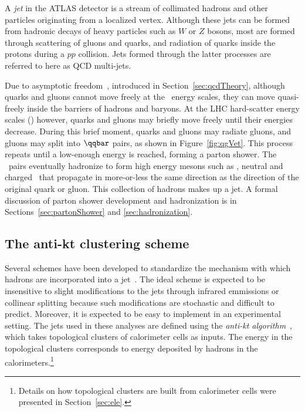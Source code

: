 \par A {\it jet} in the ATLAS detector is a stream of collimated hadrons 
and other particles originating from a localized vertex. Although these jets can be formed from 
hadronic decays of heavy particles such as $W$ or $Z$ bosons, most  
are formed through scattering of gluons and quarks, and radiation of quarks inside the protons during a $pp$ collision.
Jets formed through the latter processes are referred to here as QCD multi-jets. 

\par Due to asymptotic freedom~\cite{Gross:1998jx}, introduced in Section~\ref{sec:qcdTheory}, although 
quarks and gluons cannot move freely at the \GeV\ energy scales, they can move quasi-freely inside the barriers 
of hadrons and baryons. At the LHC hard-scatter energy scales (\TeV) however, quarks and gluons 
may briefly move freely until their energies decrease. During this brief moment, quarks and 
gluons may radiate gluons, and gluons may split into $\qqbar$ pairs, as shown in Figure~\ref{fig:qgVet}.    
This process repeats until a low-enough energy is reached, forming a parton shower. The \qqbar\ pairs 
eventually hadronize to form high energy mesons such as \pipm, neutral and charged \kaon\ that propagate in  
more-or-less the same direction as the direction of the original quark or gluon. 
This collection of hadrons makes up a jet. A formal discussion of parton shower development 
and hadronization is in Sections~\ref{sec:partonShower} and \ref{sec:hadronization}. 

\subsection{The anti-kt clustering scheme}
\par Several schemes have been developed to standardize the mechanism with which  
hadrons are incorporated into a jet~\cite{Glover:1995nx}. The ideal scheme is expected to be insensitive to 
slight modifications to the jets through infrared emmissions or collinear splitting because such modifications 
are stochastic and difficult to predict. Moreover, it is expected to be easy to 
implement in an experimental setting. The jets used in these analyses are defined using the 
{\it anti-kt algorithm}~\cite{Cacciari:2008gp}, which takes topological clusters of calorimeter 
cells as inputs. The energy in the topological clusters corresponds to energy deposited by hadrons 
in the calorimeters.\footnote{
Details on how topological clusters are built from calorimeter cells were 
presented in Section~\ref{sec:ele}.} 

